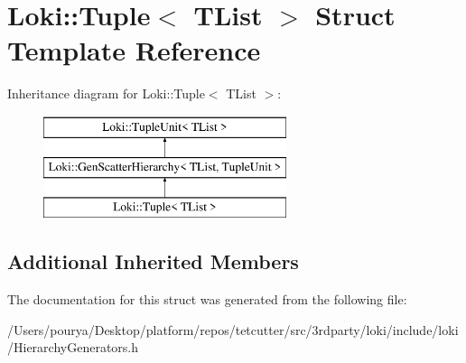 \hypertarget{structLoki_1_1Tuple}{}\section{Loki\+:\+:Tuple$<$ T\+List $>$ Struct Template Reference}
\label{structLoki_1_1Tuple}
Inheritance diagram for Loki\+:\+:Tuple$<$ T\+List $>$\+:\begin{figure}[H]
\begin{center}
\leavevmode
\includegraphics[height=3.000000cm]{structLoki_1_1Tuple}
\end{center}
\end{figure}
\subsection*{Additional Inherited Members}


The documentation for this struct was generated from the following file\+:\begin{DoxyCompactItemize}
\item 
/\+Users/pourya/\+Desktop/platform/repos/tetcutter/src/3rdparty/loki/include/loki/Hierarchy\+Generators.\+h\end{DoxyCompactItemize}
